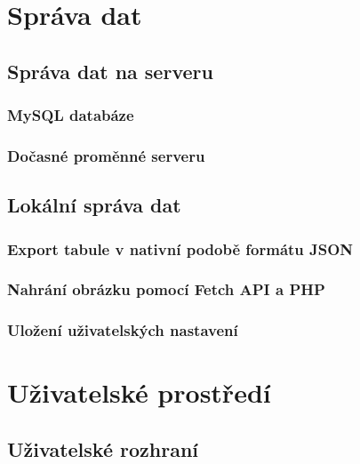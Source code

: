 



\section{Správa dat}
\label{sec:4.3}
\subsection{Správa dat na serveru}
\subsubsection{MySQL databáze}


\subsubsection{Dočasné proměnné serveru}



\subsection{Lokální správa dat}
\subsubsection{Export tabule v nativní podobě formátu JSON}


\subsubsection{Nahrání obrázku pomocí Fetch API a PHP}


\subsubsection{Uložení uživatelských nastavení}

\clearpage




\section{Uživatelské prostředí}
\label{sec:4.4}
\subsection{Uživatelské rozhraní}

